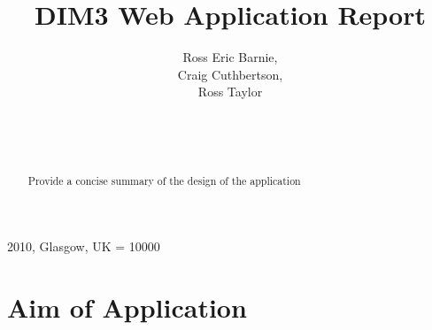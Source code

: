 \documentclass{sig-alt-release2}
\begin{document}
\newcommand{\todo}[1]{\textcolor{red}{#1}}
\def\newblock{\hskip .11em plus .33em minus .07em}

 {2010, Glasgow, UK} 
\widowpenalty = 10000

\title{DIM3 Web Application Report}

\author{
\alignauthor
Ross Eric Barnie, \\
Craig Cuthbertson, \\
Ross Taylor \\
\\
\\
\\
}
\maketitle

\begin{abstract}
Provide a concise summary of the design of the application

\end{abstract}

\section{Aim of Application}

\end{document}
